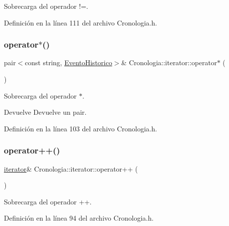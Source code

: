 Sobrecarga del operador !=. 



Definición en la línea 111 del archivo Cronologia.\+h.

\hypertarget{classCronologia_1_1iterator_a63b19e3195e5344767a4ba679ff83d83}{}\label{classCronologia_1_1iterator_a63b19e3195e5344767a4ba679ff83d83} 
\subsubsection{\texorpdfstring{operator$\ast$()}{operator*()}}
{\footnotesize\ttfamily pair$<$const string, \hyperlink{classEventoHistorico}{Evento\+Historico}$>$\& Cronologia\+::iterator\+::operator$\ast$ (\begin{DoxyParamCaption}{ }\end{DoxyParamCaption})\hspace{0.3cm}{\ttfamily [inline]}}



Sobrecarga del operador $\ast$. 

\begin{DoxyReturn}{Devuelve}
Devuelve un pair. 
\end{DoxyReturn}


Definición en la línea 103 del archivo Cronologia.\+h.

\hypertarget{classCronologia_1_1iterator_a706bd624956361f8197c716488b3f287}{}\label{classCronologia_1_1iterator_a706bd624956361f8197c716488b3f287} 
\subsubsection{\texorpdfstring{operator++()}{operator++()}}
{\footnotesize\ttfamily \hyperlink{classCronologia_1_1iterator}{iterator}\& Cronologia\+::iterator\+::operator++ (\begin{DoxyParamCaption}{ }\end{DoxyParamCaption})\hspace{0.3cm}{\ttfamily [inline]}}



Sobrecarga del operador ++. 



Definición en la línea 94 del archivo Cronologia.\+h.

